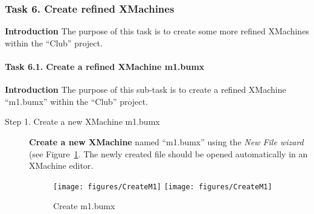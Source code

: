 \subsubsection{Task 6. Create refined XMachines}
\textbf{Introduction} The purpose of this task is to create some more refined XMachines within the ``Club'' project.

\paragraph{Task 6.1. Create a refined XMachine m1.bumx}
\textbf{Introduction} The purpose of this sub-task is to create a refined XMachine ``m1.bumx'' within the ``Club'' project.
\begin{description}
\item[Step 1. Create a new XMachine m1.bumx] \textbf{Create a new XMachine} named ``m1.bumx'' using the \emph{New File wizard} (see Figure~\ref{fig:CreateM1}. The newly created file should be opened automatically in an XMachine editor.
  \begin{figure}[!htbp]
    \centering
    \texttt{[image: figures/CreateM1]}
    \else
    \texttt{[image: figures/CreateM1]}
    \endif
    \caption{Create m1.bumx}
    \label{fig:CreateM1}
  \end{figure}


\end{description}
